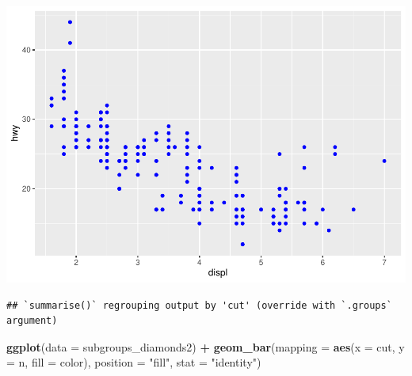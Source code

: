 \documentclass[
]{book}
\newenvironment{Shaded}{\begin{snugshade}}{\end{snugshade}}
\newcommand{\CommentTok}[1]{\textcolor[rgb]{0.56,0.35,0.01}{\textit{#1}}}
\newcommand{\DataTypeTok}[1]{\textcolor[rgb]{0.13,0.29,0.53}{#1}}
\newcommand{\KeywordTok}[1]{\textcolor[rgb]{0.13,0.29,0.53}{\textbf{#1}}}
\newcommand{\NormalTok}[1]{#1}
\newcommand{\OperatorTok}[1]{\textcolor[rgb]{0.81,0.36,0.00}{\textbf{#1}}}
\newcommand{\StringTok}[1]{\textcolor[rgb]{0.31,0.60,0.02}{#1}}
\begin{document}
\includegraphics{_main_files/figure-latex/unnamed-chunk-256-3.pdf}

\begin{Shaded}
\end{Shaded}

\begin{verbatim}
## `summarise()` regrouping output by 'cut' (override with `.groups` argument)
\end{verbatim}

\begin{Shaded}
\begin{Highlighting}[]
\KeywordTok{ggplot}\NormalTok{(}\DataTypeTok{data =}\NormalTok{ subgroups_diamonds2) }\OperatorTok{+}
\StringTok{    }\KeywordTok{geom_bar}\NormalTok{(}\DataTypeTok{mapping =} \KeywordTok{aes}\NormalTok{(}\DataTypeTok{x =}\NormalTok{ cut,}
        \DataTypeTok{y =}\NormalTok{ n, }\DataTypeTok{fill =}\NormalTok{ color),}
        \DataTypeTok{position =} \StringTok{"fill"}\NormalTok{,}
        \DataTypeTok{stat =} \StringTok{"identity"}\NormalTok{)}
\end{Highlighting}
\end{Shaded}
\end{document}
